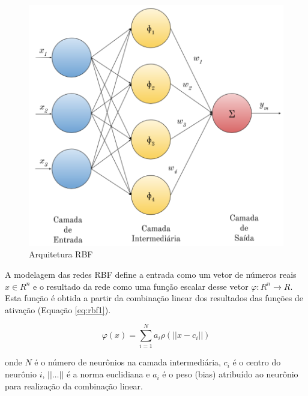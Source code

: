 \documentclass[msc, classic, a4paper]{ufbathesis}
\begin{document}
\begin{figure}[H]
\begin{center}
    \includegraphics[scale=1]{imagens/rbf_arq.png}
    \caption{Arquitetura RBF}
    \label{fig:rbg_arq}
\end{center}
\end{figure}

A modelagem das redes RBF define a entrada como um vetor de números reais ${x} \in {R} ^{n}$ e o resultado da rede como uma função escalar desse vetor $\varphi : {R} ^{n} \to {R}$.
Esta função é obtida a partir da combinação linear dos resultados das funções de ativação (Equação \ref{eq:rbf1}).

\begin{equation} \label{eq:rbf1}
    \varphi ({x})=\sum _{{i=1}}^{N}a_{i}\rho (||{x}-{c}_{i}||)
\end{equation}


onde $N$ é o número de neurônios na camada intermediária, ${c}_{i}$ é o centro do neurônio $i$, $||\ldots||$ é a norma euclidiana e $a_{i}$ é o peso (bias) atribuído ao neurônio para realização da combinação linear.


\end{document}
